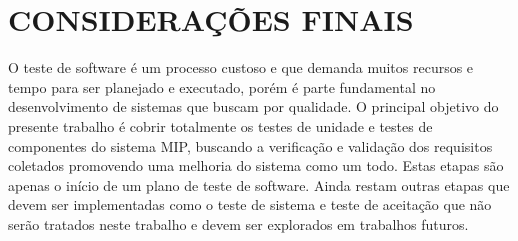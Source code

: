 \chapter{CONSIDERAÇÕES FINAIS}



O teste de software é um processo custoso e que demanda muitos recursos e tempo para ser planejado e executado, porém é parte fundamental no desenvolvimento de sistemas que buscam por qualidade.  O principal objetivo do presente trabalho é cobrir totalmente os testes de unidade e testes de componentes do sistema MIP, buscando a verificação e validação dos requisitos coletados promovendo uma melhoria do sistema como um todo. Estas etapas são apenas o início de um plano de teste de software. Ainda restam outras etapas que devem ser implementadas como o teste de sistema e teste de aceitação que não serão tratados neste trabalho e devem ser explorados em trabalhos futuros. 









